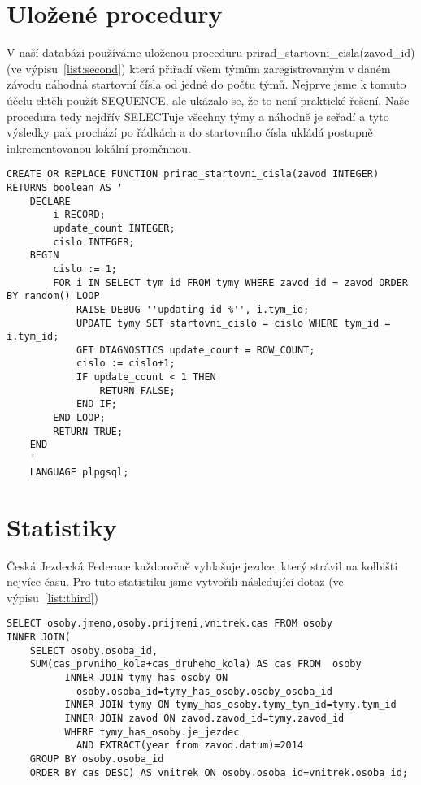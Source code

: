 \documentclass[a4paper,11pt]{article}
\theoremstyle{mytheor}
\begin{document}
\section*{Uložené procedury}
V naší databázi používáme uloženou proceduru prirad\_startovni\_cisla(zavod\_id) (ve výpisu~\ref{list:second}) která přiřadí všem týmům zaregistrovaným v daném závodu náhodná startovní čísla
od jedné do počtu týmů. Nejprve jsme k tomuto účelu chtěli použít SEQUENCE, ale ukázalo se, že to není praktické řešení. Naše procedura tedy nejdřív SELECTuje
všechny týmy a náhodně je seřadí a tyto výsledky pak prochází po řádkách a do startovního čísla ukládá postupně inkrementovanou lokální proměnnou.


\begin{lstlisting}[label={list:second},caption=Uložená procedura prirad\_startovni\_cisla\(\)]
CREATE OR REPLACE FUNCTION prirad_startovni_cisla(zavod INTEGER) RETURNS boolean AS '
	DECLARE
		i RECORD;
		update_count INTEGER;
		cislo INTEGER;
	BEGIN
		cislo := 1;
		FOR i IN SELECT tym_id FROM tymy WHERE zavod_id = zavod ORDER BY random() LOOP
			RAISE DEBUG ''updating id %'', i.tym_id;
			UPDATE tymy SET startovni_cislo = cislo WHERE tym_id = i.tym_id;
			GET DIAGNOSTICS update_count = ROW_COUNT;
			cislo := cislo+1;
			IF update_count < 1 THEN
				RETURN FALSE;
			END IF;
		END LOOP;
		RETURN TRUE;
	END
	'
	LANGUAGE plpgsql;
\end{lstlisting}

\section*{Statistiky}
Česká Jezdecká Federace každoročně vyhlašuje jezdce,
který strávil na kolbišti nejvíce času. Pro tuto statistiku jsme vytvořili následující dotaz (ve výpisu~\ref{list:third})
\begin{lstlisting}[label={list:third},caption=Statistika času na kolbišti.]
SELECT osoby.jmeno,osoby.prijmeni,vnitrek.cas FROM osoby
INNER JOIN(  
	SELECT osoby.osoba_id,
	SUM(cas_prvniho_kola+cas_druheho_kola) AS cas FROM  osoby
	      INNER JOIN tymy_has_osoby ON
	      	osoby.osoba_id=tymy_has_osoby.osoby_osoba_id 
	      INNER JOIN tymy ON tymy_has_osoby.tymy_tym_id=tymy.tym_id
	      INNER JOIN zavod ON zavod.zavod_id=tymy.zavod_id
	      WHERE tymy_has_osoby.je_jezdec
	      	AND EXTRACT(year from zavod.datum)=2014
	GROUP BY osoby.osoba_id      
	ORDER BY cas DESC) AS vnitrek ON osoby.osoba_id=vnitrek.osoba_id;    
\end{lstlisting}
\end{document}
